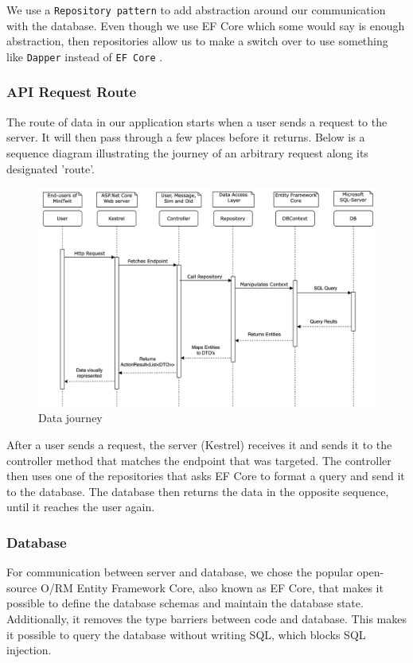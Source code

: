 We use a \texttt{Repository pattern} to add abstraction around our communication with the database. Even though we use EF Core which some would say is enough abstraction, then repositories allow us to make a switch over to use something like \texttt{Dapper} instead of \texttt{EF Core} \autocite{dapper, efcore}.

\subsubsection{API Request Route}
The route of data in our application starts when a user sends a request to the server. It will then pass through a few places before it returns. Below is a sequence diagram illustrating the journey of an arbitrary request along its designated 'route'.

\vspace{3pt}
\begin{figure}[H]
    \centering
    \includegraphics[width=0.65\linewidth]{Images/SequenceDevOps.jpg} 
    \caption{Data journey}
    \label{fig:API_Sequence}
\end{figure}
\vspace{3pt}

After a user sends a request, the server (Kestrel) receives it and sends it to the controller method that matches the endpoint that was targeted. The controller then uses one of the repositories that asks EF Core to format a query and send it to the database. The database then returns the data in the opposite sequence, until it reaches the user again.

\subsubsection{Database}
\noindent For communication between server and database, we chose the popular open-source O/RM Entity Framework Core, also known as EF Core, that makes it possible to define the database schemas and maintain the database state. Additionally, it removes the type barriers between code and database. This makes it possible to query the database without writing SQL, which blocks SQL injection.

